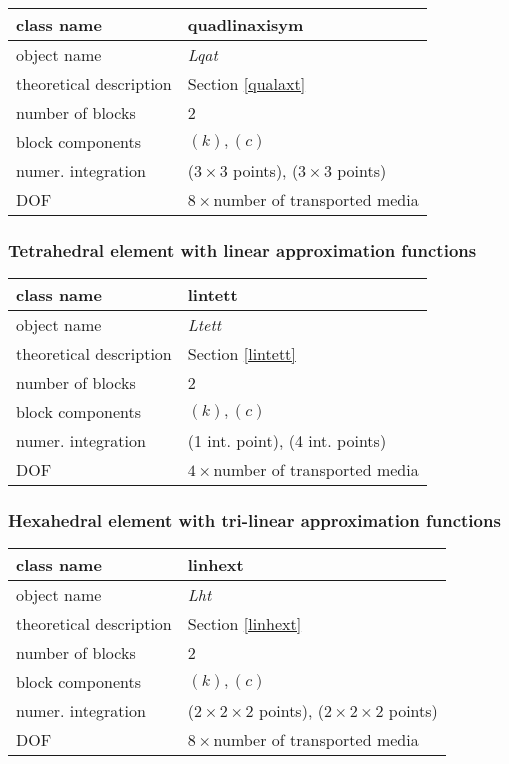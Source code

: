 \begin{center}
\begin{tabular}{|l|l|}
\hline
class name & {\sf quadlinaxisym}
\\ \hline
object name & {\it Lqat}
\\ \hline
theoretical description & Section \ref{qualaxt}
\\ \hline
number of blocks & 2
\\ \hline
block components & $(k), (c)$
\\ \hline
numer. integration & ($3 \times 3$ points), ($3 \times 3$ points)
\\ \hline
DOF & $8 \times$number of transported media
\\ \hline
\end{tabular}
\end{center}


\subsubsection{Tetrahedral element with linear approximation functions}

\begin{center}
\begin{tabular}{|l|l|}
\hline
class name & {\sf lintett}
\\ \hline
object name & {\it Ltett}
\\ \hline
theoretical description & Section \ref{lintett}
\\ \hline
number of blocks & 2
\\ \hline
block components & $(k), (c)$
\\ \hline
numer. integration & (1 int. point), (4 int. points)
\\ \hline
DOF & $4 \times$number of transported media
\\ \hline
\end{tabular}
\end{center}


\subsubsection{Hexahedral element with tri-linear approximation functions}

\begin{center}
\begin{tabular}{|l|l|}
\hline
class name & {\sf linhext}
\\ \hline
object name & {\it Lht}
\\ \hline
theoretical description & Section \ref{linhext}
\\ \hline
number of blocks & 2
\\ \hline
block components & $(k), (c)$
\\ \hline
numer. integration & ($2 \times 2 \times 2$ points), ($2 \times 2 \times 2$ points)
\\ \hline
DOF & $8 \times$number of transported media
\\ \hline
\end{tabular}
\end{center}



